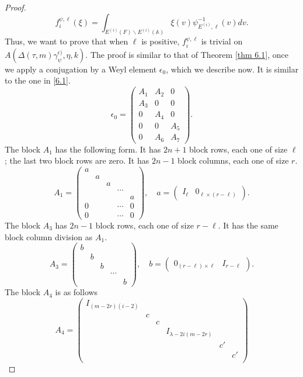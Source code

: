 \documentclass[12pts]{amsart}
\newcommand{\BA}{{\mathbb {A}}}
\begin{document}
\begin{proof}
\begin{equation}
f_i^{\psi,\ell}(\xi)=
\int_{E^{(i)}(F)\backslash
	E^{(i)}(\BA)}\xi(v)\psi^{-1}_{E^{(i)},\ell}(v)dv. 
\end{equation}
Thus, we want to prove that when $\ell$ is positive, $f_i^{\psi,\ell}$ is trivial on $A(\Delta(\tau,m)\gamma_\psi^{\epsilon)},\eta,k)$. The proof is similar to that of Theorem \ref{thm 6.1}, once we apply a conjugation by a Weyl element $\epsilon_0$, which we describe now. It is similar to the one in \eqref{6.1}.	
\begin{equation}\label{9.16}
\epsilon_0=\begin{pmatrix}A_1&A_2&0\\A_3&0&0\\0&A_4&0\\0&0&A_5\\0&A_6&A_7\end{pmatrix}.
\end{equation}
The block $A_1$ has the following form. It has $2n+1$ block rows,
each one of size $\ell$; the last two block rows are zero. It has
$2n-1$ block columns, each one of size $r$.
\begin{equation}\label{9.17}
A_1=\begin{pmatrix}a\\&a\\&&a\\&&&\cdots\\&&&&a\\0&&&\cdots
&0\\ 0&&&\cdots &0\end{pmatrix},\quad
a=\begin{pmatrix}I_\ell&0_{\ell\times (r-\ell)}\end{pmatrix}.
\end{equation}
The block $A_3$ has $2n-1$ block rows, each one of size $r-\ell$. It has the same block column division as $A_1$.
\begin{equation}\label{9.19}
A_3=\begin{pmatrix} b\\&b\\&&b\\&&&\cdots\\&&&&b\end{pmatrix},
\quad b=\begin{pmatrix}0_{(r-\ell)\times \ell}&I_{r-\ell}\end{pmatrix}.
\end{equation}
The block $A_4$ is as follows
\begin{equation}\label{9.18}
A_4=\begin{pmatrix}I_{(m-2r)(i-2)}\\&c\\&&c\\&&&I_{\lambda-2i(m-2r)}\\&&&&c'\\&&&&&c'\\

\end{pmatrix}
\end{equation}
\end{proof}
\end{document}
